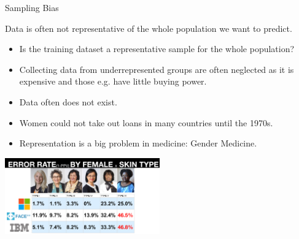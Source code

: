 \begin{vbframe}{Sampling Bias}

Data is often not representative of the whole population we want to predict. 
\begin{itemize}
   \item Is the training dataset a representative sample for the whole population?
   \item Collecting data from underrepresented groups are often neglected as it is expensive and those e.g. have little buying power.
   \item Data often does not exist.
   \item Women could not take out loans in many countries until the 1970s.
   \item Representation is a big problem in medicine: Gender Medicine.
\end{itemize}

\begin{center}
     \includegraphics[width=0.5\textwidth]{figure_man/biases-sampling.png}
     \end{center}
\end{vbframe}

